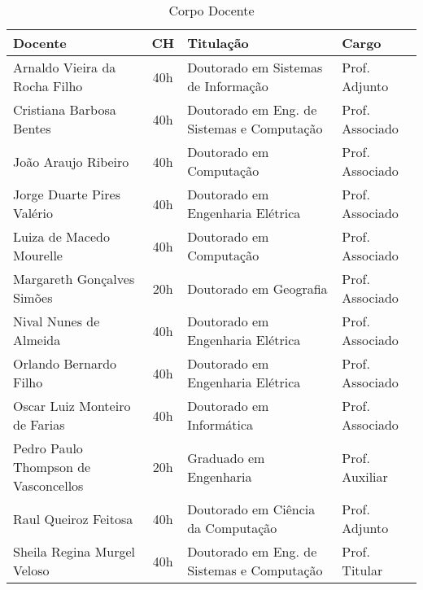 \begin{table}
	\centering
	\caption{Corpo Docente}
	\label{CorpoDocente}
	\begin{tabular}{|l|c|l|l|}
		\hline
		{\textbf{Docente}}                   & \textbf{CH} & \textbf{Titulação}                         & \textbf{Cargo}  \\
		\hline
		Arnaldo Vieira da Rocha Filho        & 40h         & Doutorado em Sistemas de Informação        & Prof. Adjunto   \\
		Cristiana Barbosa Bentes             & 40h         & Doutorado em Eng. de Sistemas e Computação & Prof. Associado \\
		João Araujo Ribeiro                  & 40h         & Doutorado em Computação                    & Prof. Associado \\
		Jorge Duarte Pires Valério           & 40h         & Doutorado em Engenharia Elétrica           & Prof. Associado \\
		Luiza de Macedo Mourelle             & 40h         & Doutorado em Computação                    & Prof. Associado \\
		Margareth Gonçalves Simões           & 20h         & Doutorado em Geografia                     & Prof. Associado \\
		Nival Nunes de Almeida               & 40h         & Doutorado em Engenharia Elétrica           & Prof. Associado \\
		Orlando Bernardo Filho               & 40h         & Doutorado em Engenharia Elétrica           & Prof. Associado \\
		Oscar Luiz Monteiro de Farias        & 40h         & Doutorado em Informática                   & Prof. Associado \\
		Pedro Paulo Thompson de Vasconcellos & 20h         & Graduado em Engenharia                     & Prof. Auxiliar  \\
		Raul Queiroz Feitosa                 & 40h         & Doutorado em Ciência da Computação         & Prof. Adjunto   \\
		Sheila Regina Murgel Veloso          & 40h         & Doutorado em Eng. de Sistemas e Computação & Prof. Titular   \\
		\hline
	\end{tabular}
\end{table}






